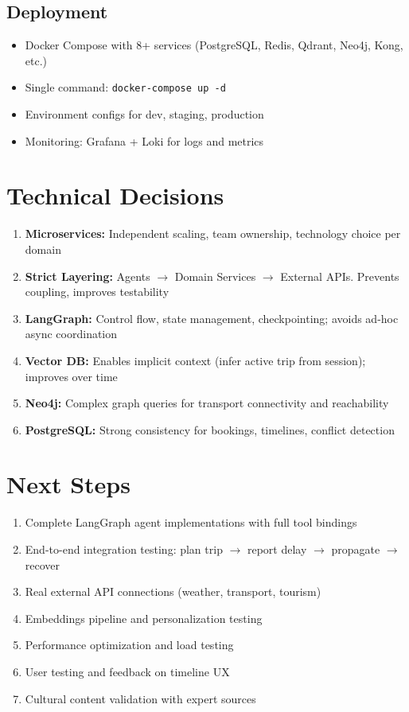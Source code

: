 \documentclass[11pt]{article}
\begin{document}
\subsection{Deployment}

\begin{itemize}
    \item Docker Compose with 8+ services (PostgreSQL, Redis, Qdrant, Neo4j, Kong, etc.)
    \item Single command: \texttt{docker-compose up -d}
    \item Environment configs for dev, staging, production
    \item Monitoring: Grafana + Loki for logs and metrics
\end{itemize}

\section{Technical Decisions}

\begin{enumerate}
    \item \textbf{Microservices:} Independent scaling, team ownership, technology choice per domain
    \item \textbf{Strict Layering:} Agents $\rightarrow$ Domain Services $\rightarrow$ External APIs. Prevents coupling, improves testability
    \item \textbf{LangGraph:} Control flow, state management, checkpointing; avoids ad-hoc async coordination
    \item \textbf{Vector DB:} Enables implicit context (infer active trip from session); improves over time
    \item \textbf{Neo4j:} Complex graph queries for transport connectivity and reachability
    \item \textbf{PostgreSQL:} Strong consistency for bookings, timelines, conflict detection
\end{enumerate}

\section{Next Steps}

\begin{enumerate}
    \item Complete LangGraph agent implementations with full tool bindings
    \item End-to-end integration testing: plan trip $\rightarrow$ report delay $\rightarrow$ propagate $\rightarrow$ recover
    \item Real external API connections (weather, transport, tourism)
    \item Embeddings pipeline and personalization testing
    \item Performance optimization and load testing
    \item User testing and feedback on timeline UX
    \item Cultural content validation with expert sources
\end{enumerate}
\end{document}

